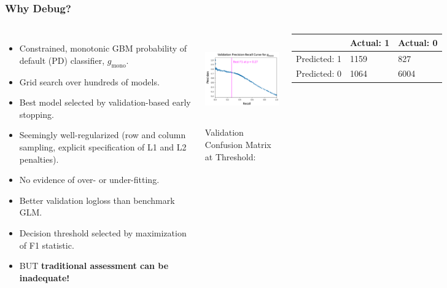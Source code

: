 \documentclass[11pt,
               aspectratio=169,
               hyperref={colorlinks}
               ]{beamer}
\begin{document}
			\begin{frame}

					\frametitle{Why Debug?}

					\begin{columns}
						
						\centering
						\begin{itemize}
							\item \scriptsize Constrained, monotonic GBM probability of default (PD) classifier, $g_{\text{mono}}$.
							\item Grid search over hundreds of models. 
							\item Best model selected by validation-based early stopping.
							\item Seemingly well-regularized (row and column sampling, explicit specification of L1 and L2 penalties).
							\item No evidence of over- or under-fitting.
							\item Better validation logloss than benchmark GLM.
							\item Decision threshold selected by maximization of F1 statistic.
							\item BUT \textbf{traditional assessment can be inadequate!} 
						\end{itemize}\normalsize
						
						\vspace{20pt}
							\centering
							\includegraphics[height=110pt]{img/pr_auc.png}\\
							\tiny
							\vspace{5pt}
							Validation Confusion Matrix at Threshold:\vspace{-7pt}
							\begin{table}
								\hspace{7pt}
								\begin{tabular}{ | p{1.3cm} | p{1cm} | p{1.3cm} | }
									\hline
								 	& Actual: 1 & Actual: 0 \\ 
									\hline
									Predicted: 1 & 1159	& 827 \\
									\hline
									Predicted: 0 & 1064	& 6004 \\
									\hline
								\end{tabular}	
							\end{table}	
						\normalsize
				
					\end{columns}
							
			\end{frame}
\end{document}
